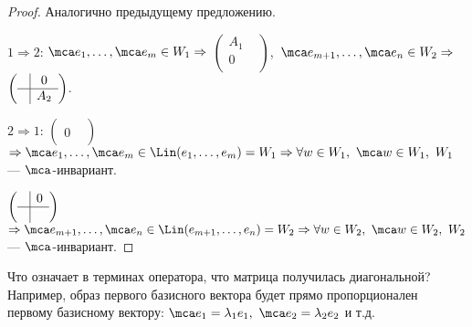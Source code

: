 \documentclass[main]{subfiles}
\begin{document}
\begin{proof}
    Аналогично предыдущему предложению.

    $1 \Rightarrow 2$:
    $\mca e_1, \ldots, \mca e_m \in W_1 \Rightarrow$ $\left(\begin{array}{c|c}
                A_1 & \\
                \hline
                0   & \\
            \end{array}\right)$,\
    $\mca e_{m+1}, \ldots, \mca e_n \in W_2 \Rightarrow$ $\left(\begin{array}{c|c}
                 & 0   \\
                \hline
                 & A_2 \\
            \end{array}\right) $.

    $2\Rightarrow 1$:
    $\left(\begin{array}{c|c}
                  & \\
                \hline
                0 & \\
            \end{array}\right) $ $\Rightarrow \mca e_1, \ldots, \mca e_m \in \Lin(e_1, \ldots, e_m) = W_1
        \Rightarrow \forall w \in W_1,\ \mca w \in W_1,\ W_1$ — $\mca$-инвариант.

    $\left(\begin{array}{c|c}
                 & 0 \\
                \hline
                 &   \\
            \end{array}\right) $ $\Rightarrow \mca e_{m+1}, \ldots, \mca e_n \in \Lin(e_{m+1}, \ldots, e_n) = W_2
        \Rightarrow \forall w \in W_2,\ \mca w \in W_2,\ W_2$ — $\mca$-инвариант.
\end{proof}

Что означает в терминах оператора, что матрица получилась диагональной? Например, образ первого базисного вектора будет
прямо пропорционален первому базисному вектору: $\mca e_1 = \lambda_1 e_1,\ \mca e_2 = \lambda_2 e_2$ и т.д.
\end{document}
